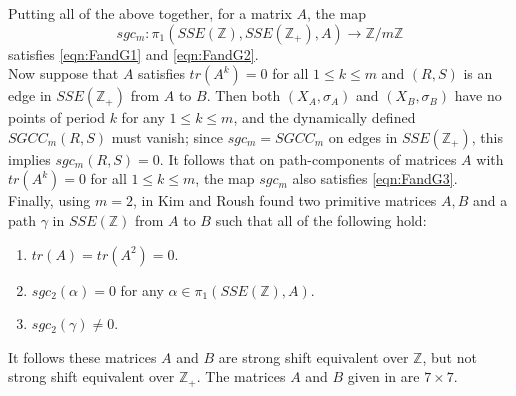 \documentclass{amsart}
\newcommand{\ai}{\index[authors]}
\theoremstyle{definition}
\theoremstyle{definition}
\numberwithin{equation}{subsection}
\begin{document}
Putting all of the above together, for a matrix $A$, the map
$$sgc_{m} \colon \pi_{1}(SSE(\mathbb{Z}),SSE(\mathbb{Z}_{+}),A) \to \mathbb{Z}/m\mathbb{Z}$$
satisfies \eqref{eqn:FandG1} and \eqref{eqn:FandG2}.\\

Now suppose that $A$ satisfies $tr(A^{k})=0$ for all $1 \le k \le m$ and $(R,S)$ is an edge in $SSE(\mathbb{Z}_{+})$ from $A$ to $B$. Then both $(X_{A},\sigma_{A})$ and $(X_{B},\sigma_{B})$ have no points of period $k$ for any $1 \le k \le m$, and the dynamically defined $SGCC_{m}(R,S)$ must vanish; since $sgc_{m} = SGCC_{m}$ on edges in $SSE(\mathbb{Z}_{+})$, this implies $sgc_{m}(R,S) = 0$. It follows that on path-components of matrices $A$ with $tr(A^{k})=0$ for all $1 \le k \le m$, the map $sgc_{m}$ also satisfies \eqref{eqn:FandG3}.\\

Finally, using $m=2$, in \cite{S11} Kim\ai{Kim, K.H.} and Roush\ai{Roush, F.W.} found two primitive matrices $A,B$ and a path $\gamma$ in $SSE(\mathbb{Z})$ from $A$ to $B$ such that all of the following hold:
\begin{enumerate}
\item
$tr(A)=tr(A^{2})=0$.
\item
$sgc_{2}(\alpha) = 0$ for any $\alpha \in \pi_{1}(SSE(\mathbb{Z}),A)$.
\item
$sgc_{2}(\gamma) \ne 0$.
\end{enumerate}

It follows these matrices $A$ and $B$ are strong shift equivalent over $\mathbb{Z}$, but not strong shift equivalent over $\mathbb{Z}_{+}$. The matrices $A$ and $B$ given in \cite{S11} are $7 \times 7$.
\end{document}
